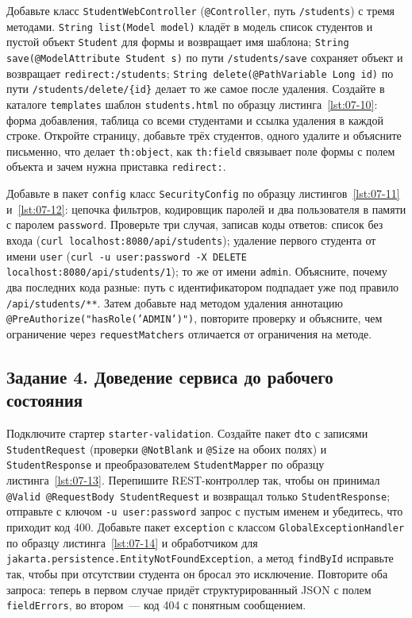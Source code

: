Добавьте класс \texttt{StudentWebController} (\texttt{@Controller}, путь
\texttt{/students}) с тремя методами.
\texttt{String list(Model model)} кладёт в модель список студентов и пустой
объект \texttt{Student} для формы и возвращает имя шаблона;
\texttt{String save(@ModelAttribute Student s)} по пути
\texttt{/students/save} сохраняет объект и возвращает
\texttt{redirect:/students}; \texttt{String delete(@PathVariable Long id)} по
пути \texttt{/students/delete/\{id\}} делает то же самое после удаления. Создайте в каталоге \texttt{templates}
шаблон \texttt{students.html} по образцу листинга~\ref{lst:07-10}: форма
добавления, таблица со всеми студентами и ссылка удаления в каждой строке.
Откройте страницу, добавьте трёх студентов, одного удалите и объясните
письменно, что делает \texttt{th:object}, как \texttt{th:field} связывает поле
формы с полем объекта и зачем нужна приставка \texttt{redirect:}.

Добавьте в пакет \texttt{config} класс \texttt{SecurityConfig} по образцу
листингов~\ref{lst:07-11} и~\ref{lst:07-12}: цепочка фильтров, кодировщик
паролей и два пользователя в памяти с паролем \texttt{password}. Проверьте
три случая, записав коды ответов: список без входа
(\texttt{curl localhost:8080/api/students}); удаление первого студента от
имени \texttt{user} (\texttt{curl -u user:password -X DELETE
localhost:8080/api/students/1}); то же от имени \texttt{admin}. Объясните,
почему два последних кода разные: путь с идентификатором подпадает уже под
правило \texttt{/api/students/**}. Затем добавьте над
методом удаления аннотацию \texttt{@PreAuthorize("hasRole('ADMIN')")},
повторите проверку и объясните, чем ограничение через
\texttt{requestMatchers} отличается от ограничения на методе.

\subsection*{Задание 4. Доведение сервиса до рабочего состояния}

Подключите стартер \texttt{starter-validation}. Создайте пакет \texttt{dto} с
записями \texttt{StudentRequest} (проверки \texttt{@NotBlank} и
\texttt{@Size} на обоих полях) и \texttt{StudentResponse} и преобразователем
\texttt{StudentMapper} по образцу листинга~\ref{lst:07-13}.
Перепишите REST-контроллер так, чтобы он принимал
\texttt{@Valid @RequestBody StudentRequest} и возвращал только
\texttt{StudentResponse}; отправьте с ключом \texttt{-u user:password} запрос
с пустым именем и убедитесь, что приходит код 400. Добавьте пакет
\texttt{exception} с классом \texttt{GlobalExceptionHandler} по образцу
листинга~\ref{lst:07-14} и обработчиком для
\texttt{jakarta.persistence.EntityNotFoundException}, а метод
\texttt{findById} исправьте так, чтобы при отсутствии студента он бросал это
исключение. Повторите оба запроса: теперь в первом случае придёт
структурированный JSON с полем \texttt{fieldErrors}, во втором~--- код 404 с
понятным сообщением.

